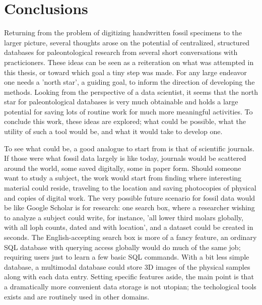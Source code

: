 \documentclass{article}
\begin{document}
\section{Conclusions}

Returning from the problem of digitizing handwritten fossil specimens to the larger picture, several thoughts arose on the potential of centralized, structured databases for paleontological research from several short conversations with practicioners.
These ideas can be seen as a reiteration on what was attempted in this thesis, or toward which goal a tiny step was made. For any large endeavor one needs a 'north star', a guiding goal, to inform the direction of developing the methods. Looking from the perspective of a data scientist, it seems that the north star for paleontological databases is very much obtainable and holds a large potential for saving lots of routine work for much more meaningful activities. To conclude this work, these ideas are explored; what could be possible, what the utility of such a tool would be, and what it would take to develop one.

To see what could be, a good analogue to start from is that of scientific journals. If those were what fossil data largely is like today, journals would be scattered around the world, some saved digitally, some in paper form. Should someone want to study a subject, the work would start from finding where interesting material could reside, traveling to the location and saving photocopies of physical and copies of digital work. The very possible future scenario for fossil data would be like Google Scholar is for research: one search box, where a researcher wishing to analyze a subject could write, for instance, 'all lower third molars globally, with all loph counts, dated and with location', and a dataset could be created in seconds. The English-accepting search box is more of a fancy feature, an ordinary SQL database with querying access globally would do much of the same job; requiring users just to learn a few basic SQL commands. With a bit less simple database, a multimodal database could store 3D images of the physical samples along with each data entry. Setting specific features aside, the main point is that a dramatically more convenient data storage is not utopian; the techological tools exists and are routinely used in other domains.
\end{document}
